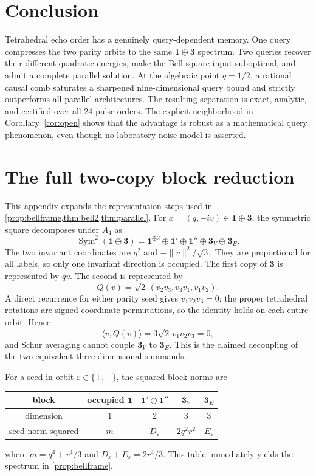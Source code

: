 \documentclass[11pt]{article}
\theoremstyle{definition}
\begin{document}
\section{Conclusion}

Tetrahedral echo order has a genuinely query-dependent memory.  One query
compresses the two parity orbits to the same $\mathbf1\oplus\mathbf3$
spectrum.  Two queries recover their different quadratic energies, make the
Bell-square input suboptimal, and admit a complete parallel solution.  At the
algebraic point $q=1/2$, a rational causal comb saturates a sharpened
nine-dimensional query bound and strictly outperforms all parallel
architectures.  The resulting separation is exact, analytic, and certified
over all 24 pulse orders.  The explicit neighborhood in
Corollary~\ref{cor:open} shows that the advantage is robust as a mathematical query
phenomenon, even though no laboratory noise model is asserted.

\appendix

\section{The full two-copy block reduction}\label{app:block}

This appendix expands the representation steps used in
\cref{prop:bellframe,thm:bell2,thm:parallel}.
For $x=(q,-iv)\in\mathbf1\oplus\mathbf3$, the symmetric square decomposes
under $A_4$ as
\[
 \operatorname{Sym}^2(\mathbf1\oplus\mathbf3)
 =\mathbf1^{\oplus2}\oplus\mathbf1'\oplus\mathbf1''
  \oplus\mathbf3_V\oplus\mathbf3_E.
\]
The two invariant coordinates are $q^2$ and $-\lVert v\rVert^2/\sqrt3$.
They are proportional for all labels, so only one invariant direction is
occupied.  The first copy of $\mathbf3$ is represented by $qv$.  The second
is represented by
\[
 Q(v)=\sqrt2\,(v_2v_3,v_3v_1,v_1v_2).
\]
A direct recurrence for either parity seed gives $v_1v_2v_3=0$; the proper
tetrahedral rotations are signed coordinate permutations, so the identity
holds on each entire orbit.  Hence
\[
 \langle v,Q(v)\rangle=3\sqrt2\,v_1v_2v_3=0,
\]
and Schur averaging cannot couple $\mathbf3_V$ to $\mathbf3_E$.  This is the
claimed decoupling of the two equivalent three-dimensional summands.

For a seed in orbit $\varepsilon\in\{+,-\}$, the squared block norms are
\begin{center}
\begin{tabular}{@{}ccccc@{}}
\toprule
block & occupied $\mathbf1$ & $\mathbf1'\oplus\mathbf1''$
 & $\mathbf3_V$ & $\mathbf3_E$\\
\midrule
dimension & 1 & 2 & 3 & 3\\
seed norm squared & $m$ & $D_\varepsilon$ & $2q^2r^2$ & $E_\varepsilon$\\
\bottomrule
\end{tabular}
\end{center}
where $m=q^4+r^4/3$ and $D_\varepsilon+E_\varepsilon=2r^4/3$.
This table immediately yields the spectrum in \cref{prop:bellframe}.
\end{document}
